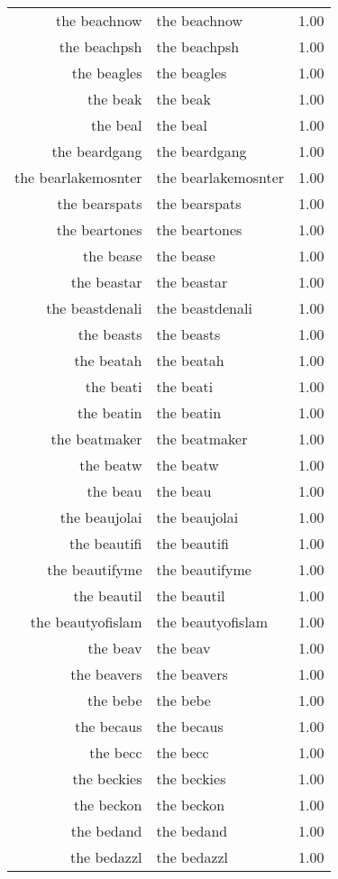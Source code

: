\begin{table}[ht]
\begin{tabular}{rlr}
  the beachnow & the beachnow & 1.00 \\ 
  the beachpsh & the beachpsh & 1.00 \\ 
  the beagles & the beagles & 1.00 \\ 
  the beak & the beak & 1.00 \\ 
  the beal & the beal & 1.00 \\ 
  the beardgang & the beardgang & 1.00 \\ 
  the bearlakemosnter & the bearlakemosnter & 1.00 \\ 
  the bearspats & the bearspats & 1.00 \\ 
  the beartones & the beartones & 1.00 \\ 
  the bease & the bease & 1.00 \\ 
  the beastar & the beastar & 1.00 \\ 
  the beastdenali & the beastdenali & 1.00 \\ 
  the beasts & the beasts & 1.00 \\ 
  the beatah & the beatah & 1.00 \\ 
  the beati & the beati & 1.00 \\ 
  the beatin & the beatin & 1.00 \\ 
  the beatmaker & the beatmaker & 1.00 \\ 
  the beatw & the beatw & 1.00 \\ 
  the beau & the beau & 1.00 \\ 
  the beaujolai & the beaujolai & 1.00 \\ 
  the beautifi & the beautifi & 1.00 \\ 
  the beautifyme & the beautifyme & 1.00 \\ 
  the beautil & the beautil & 1.00 \\ 
  the beautyofislam & the beautyofislam & 1.00 \\ 
  the beav & the beav & 1.00 \\ 
  the beavers & the beavers & 1.00 \\ 
  the bebe & the bebe & 1.00 \\ 
  the becaus & the becaus & 1.00 \\ 
  the becc & the becc & 1.00 \\ 
  the beckies & the beckies & 1.00 \\ 
  the beckon & the beckon & 1.00 \\ 
  the bedand & the bedand & 1.00 \\ 
  the bedazzl & the bedazzl & 1.00 \\ 

\end{tabular}
\end{table}
